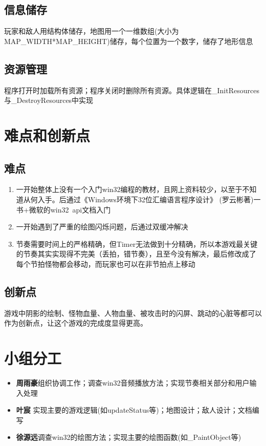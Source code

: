 \documentclass[11pt,a4paper]{article}	%
\begin{document}
\subsection{信息储存}
玩家和敌人用结构体储存，地图用一个一维数组(大小为MAP\_WIDTH*MAP\_HEIGHT)储存，每个位置为一个数字，储存了地形信息
\subsection{资源管理}
程序打开时加载所有资源；程序关闭时删除所有资源。具体逻辑在\_InitResources与\_DestroyResources中实现
\section{难点和创新点}
\subsection{难点}
\begin{enumerate}
	\item 一开始整体上没有一个入门win32编程的教材，且网上资料较少，以至于不知道从何入手。后通过《Windows环境下32位汇编语言程序设计》 (罗云彬著)一书+微软的win32\ api文档入门
	\item 一开始遇到了严重的绘图闪烁问题，后通过双缓冲解决
	\item 节奏需要时间上的严格精确，但Timer无法做到十分精确，所以本游戏最关键的节奏其实实现得不完美（丢拍，错节奏），且至今没有解决，最后修改成了每个节拍怪物都会移动，而玩家也可以在非节拍点上移动
\end{enumerate}
\subsection{创新点}
游戏中阴影的绘制、怪物血量、人物血量、被攻击时的闪屏、跳动的心脏等都可以作为创新点，让这个游戏的完成度显得更高。
\section{小组分工}
\begin{itemize}
	\item \textbf{周雨豪}\quad 组织协调工作；调查win32音频播放方法；实现节奏相关部分和用户输入处理
	\item \textbf{叶宸} \quad 实现主要的游戏逻辑(如updateStatus等)；地图设计；敌人设计；文档编写
	\item \textbf{徐源远}\quad 调查win32的绘图方法；实现主要的绘图函数(如\_PaintObject等)
\end{itemize}
\end{document}
